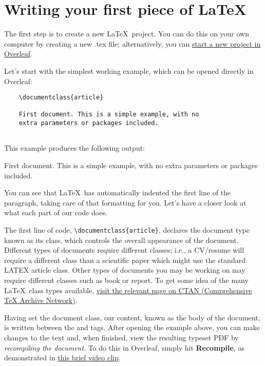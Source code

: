 \section{Writing your first piece of \LaTeX}

The first step is to create a new \LaTeX\ project. You can do this on your own computer by creating a new .tex file; alternatively, you can \href{https://www.overleaf.com/learn/how-to/Creating_a_document_in_Overleaf}{start a new project in Overleaf}.

Let’s start with the simplest working example, which can be opened directly in Overleaf:

\begin{tcolorbox}
\begin{verbatim}
    \documentclass{article}
    
    First document. This is a simple example, with no 
    extra parameters or packages included.
    
\end{verbatim}
\end{tcolorbox}

This example produces the following output:

\begin{mdframed}
\-\hspace{20pt}First document. This is a simple example, with no 
extra parameters or packages included.
\end{mdframed}

You can see that \LaTeX\ has automatically indented the first line of the paragraph, taking care of that formatting for you. Let’s have a closer look at what each part of our code does.

The first line of code, \verb|\documentclass{article}|, declares the document type known as its class, which controls the overall appearance of the document. Different types of documents require different classes; i.e., a CV/resume will require a different class than a scientific paper which might use the standard LATEX article class. Other types of documents you may be working on may require different classes such as book or report. To get some idea of the many \LaTeX\ class types available, \href{https://www.ctan.org/topic/class}{visit the relevant page on CTAN (Comprehensive TeX Archive Network)}.

Having set the document class, our content, known as the body of the document, is written between the \verb|| and \verb|| tags. After opening the example above, you can make changes to the text and, when finished, view the resulting typeset PDF by \emph{recompiling the document}. To do this in Overleaf, simply hit \textbf{Recompile}, as demonstrated in \href{https://videos.ctfassets.net/nrgyaltdicpt/6yo2PA5aMV3OEZl5NtZKWu/54395f569b830b8183b5e0058d5bc0cc/LL30recompile.mp4}{this brief video clip}.

